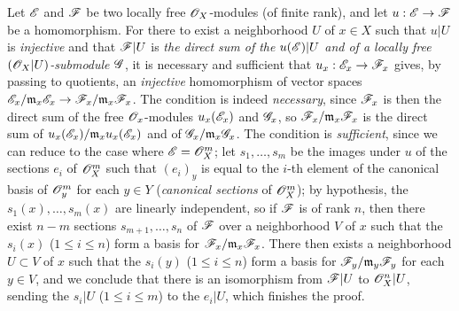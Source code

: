 \begin{env}[5.5.5]
\label{0.5.5.5}
Let $\mathscr{E}$ and $\mathscr{F}$ be two locally free $\mathscr{O}_X$-modules (of finite rank), and let $u:\sh{E}\to\sh{F}$ be a homomorphism.
For there to exist a neighborhood $U$ of $x\in X$ such that $u|U$ is \emph{injective} and that $\mathscr{F}|U$ is \emph{the direct sum of the $u(\mathscr{E})|U$ and of a locally free $(\mathscr{O}_X|U)$-submodule $\mathscr{G}$}, it is necessary and sufficient that $u_x:\sh{E}_x\to\sh{F}_x$ gives, by passing to quotients, an \emph{injective} homomorphism of vector spaces $\sh{E}_x/\fk{m}_x\sh{E}_x\to\sh{F}_x/\fk{m}_x\sh{F}_x$.
The condition is indeed \emph{necessary}, since $\mathscr{F}_x$ is then the direct sum of the free $\mathscr{O}_x$-modules $u_x(\mathscr{E}_x)$ and $\mathscr{G}_x$, so $\mathscr{F}_x/\mathfrak{m}_x\mathscr{F}_x$ is the direct sum of $u_x(\mathscr{E}_x)/\mathfrak{m}_x u_x(\mathscr{E}_x)$ and of $\mathscr{G}_x/\mathfrak{m}_x\mathscr{G}_x$.
The condition is \emph{sufficient}, since we can reduce to the case where $\mathscr{E}=\mathscr{O}_X^m$;
let $s_1,\dots,s_m$ be the images under $u$ of the sections $e_i$ of $\mathscr{O}_X^m$ such that $(e_i)_y$ is equal to the $i$-th element of the canonical basis of $\mathscr{O}_y^m$ for each $y\in Y$ (\emph{canonical sections} of $\mathscr{O}_X^m$);
by hypothesis, the $s_1(x),\dots,s_m(x)$ are linearly independent, so if $\mathscr{F}$ is of rank $n$, then there exist $n-m$ sections $s_{m+1},\dots,s_n$ of $\mathscr{F}$ over a neighborhood $V$ of $x$ such that the $s_i(x)$ ($1\leq i\leq n$) form a basis for $\mathscr{F}_x/\mathfrak{m}_x\mathscr{F}_x$.
There then exists  a neighborhood $U\subset V$ of $x$ such that the $s_i(y)$ ($1\leq i\leq n$) form a basis for $\mathscr{F}_y/\mathfrak{m}_y\mathscr{F}_y$ for each $y\in V$, and we conclude  that there is an isomorphism from $\mathscr{F}|U$ to $\mathscr{O}_X^n|U$, sending the $s_i|U$ ($1\leq i\leq m$) to the $e_i|U$, which finishes the proof.
\end{env}
